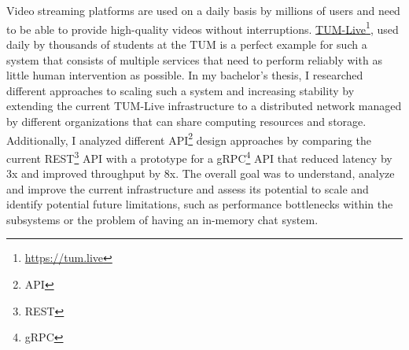 \chapter{\abstractname}

Video streaming platforms are used on a daily basis by millions of users and need to be able to provide high-quality videos without interruptions. \href{https://tum.live}{TUM-Live}\footnote{\url{https://tum.live}}, used daily by thousands of students at the \ac{TUM} is a perfect example for such a system that consists of multiple services that need to perform reliably with as little human intervention as possible.
In my bachelor's thesis, I researched different approaches to scaling such a system and increasing stability by extending the current TUM-Live infrastructure to a distributed network managed by different organizations that can share computing resources and storage. Additionally, I analyzed different API\footnote{\ac{API}} design approaches by comparing the current REST\footnote{\ac{REST}} \ac{API} with a prototype for a gRPC\footnote{\ac{gRPC}} \ac{API} that reduced latency by 3x and improved throughput by 8x. The overall goal was to understand, analyze and improve the current infrastructure and assess its potential to scale and identify potential future limitations, such as performance bottlenecks within the subsystems or the problem of having an in-memory chat system.
